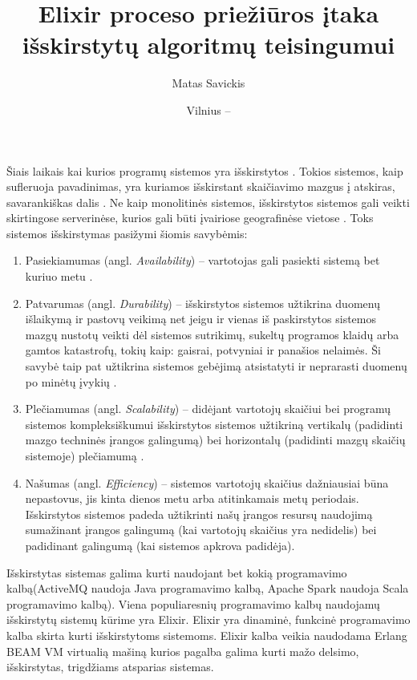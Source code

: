 \documentclass{VUMIFPSmagistrinis}
\title{Elixir proceso priežiūros įtaka išskirstytų algoritmų teisingumui}
\author{Matas Savickis}
\date{Vilnius – \the\year}
\begin{document}

\maketitle

\tableofcontents



		Šiais laikais kai kurios programų sistemos yra išskirstytos \cite{mcr}. 
		Tokios sistemos, kaip sufleruoja pavadinimas, yra kuriamos išskirstant skaičiavimo mazgus į atskiras, savarankiškas dalis \cite{coulouris2005distributed}.
		Ne kaip monolitinės sistemos, išskirstytos sistemos gali veikti skirtingose serverinėse, kurios gali būti įvairiose geografinėse vietose \cite{shirriff2006method}.
		Toks sistemos išskirstymas pasižymi šiomis savybėmis:

		\begin{enumerate}
			\item{Pasiekiamumas (angl. {\it Availability}) -- vartotojas gali pasiekti sistemą bet kuriuo metu \cite{180327}.}
			\item{Patvarumas (angl. {\it Durability}) -- išskirstytos sistemos užtikrina duomenų išlaikymą ir pastovų veikimą net jeigu ir vienas iš paskirstytos sistemos mazgų nustotų veikti dėl sistemos sutrikimų, sukeltų programos klaidų arba gamtos katastrofų, tokių kaip: gaisrai, potvyniai ir panašios nelaimės. Ši savybė taip pat užtikrina sistemos gebėjimą atsistatyti ir neprarasti duomenų po minėtų įvykių \cite{5470366}.}
			\item{Plečiamumas (angl. {\it Scalability}) -- didėjant vartotojų skaičiui bei programų sistemos kompleksiškumui išskirstytos sistemos užtikriną vertikalų (padidinti mazgo techninės įrangos galingumą) bei horizontalų (padidinti mazgų skaičių sistemoje) plečiamumą \cite{862209}.}
			\item{Našumas (angl. {\it Efficiency}) -- sistemos vartotojų skaičius dažniausiai būna nepastovus, jis kinta dienos metu arba atitinkamais metų periodais. Išskirstytos sistemos padeda užtikrinti našų įrangos resursų naudojimą sumažinant įrangos galingumą (kai vartotojų skaičius yra nedidelis) bei padidinant galingumą (kai sistemos apkrova padidėja).}
		\end{enumerate}

		Išskirstytas sistemas galima kurti naudojant bet kokią programavimo kalbą(ActiveMQ \cite{snyder2011activemq} naudoja Java programavimo kalbą, Apache Spark \cite{spark2018apache} naudoja Scala programavimo kalbą).
		Viena populiaresnių programavimo kalbų naudojamų išskirstytų sistemų kūrime yra Elixir.
		Elixir yra dinaminė, funkcinė programavimo kalba skirta kurti išskirstytoms sistemoms.
		Elixir kalba veikia naudodama Erlang BEAM VM virtualią mašiną kurios pagalba galima kurti mažo delsimo, išskirstytas, trigdžiams atsparias sistemas.
\end{document}
